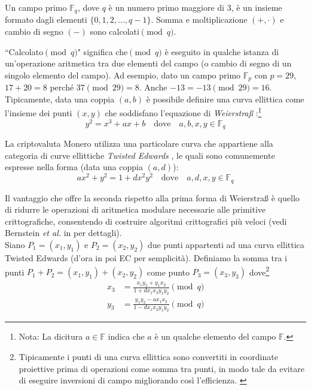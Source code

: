 Un campo primo \(\mathbb{F}_q\), dove \(q\) è un numero primo maggiore di 3, è un insieme formato dagli elementi \(\{0, 1, 2, ..., q-1\}\). Somma e moltiplicazione \((+,  \cdot)\) e cambio di segno $(-)$ sono calcolati\( \pmod q\).

``Calcolato\( \pmod q\)" significa che\( \pmod q\) è eseguito in qualche istanza di un'operazione aritmetica tra due elementi del campo (o cambio di segno di un singolo elemento del campo). Ad esempio, dato un campo primo \(\mathbb{F}_p\) con $p = 29$, $17+20=8$ perché $37 \pmod{29} = 8$. Anche $-13 = -13 \pmod{29} = 16$.\\

Tipicamente, data una coppia $(a,b)$ è possibile definire una curva ellittica come l'insieme dei punti \((x, y)\) che soddisfano l'equazione di {\em Weierstraß} \cite{Hankerson:2003:GEC:940321}:\footnote{\label{notation1}Nota: La dicitura $a \in \mathbb{F}$ indica che $a$ è un qualche elemento del campo $\mathbb{F}$.}\vspace{.175cm}
\[y^2 = x^3 + a x + b \quad \textrm{dove} \quad a, b, x, y \in \mathbb{F}_q\]

La criptovaluta Monero utilizza una particolare curva che appartiene alla categoria di curve ellittiche {\em Twisted Edwards} \cite{Bernstein2008}, le quali sono comunemente espresse nella forma (data una coppia $(a,d)$):\vspace{.175cm}
\[a x^2 + y^2 = 1 + d x^2 y^2 \quad \textrm{dove} \quad a, d, x, y \in \mathbb{F}_q \]


Il vantaggio che offre la seconda rispetto alla prima forma di Weierstraß è quello di ridurre le operazioni di aritmetica modulare necessarie alle primitive crittografiche, consentendo di costruire algoritmi crittografici più veloci (vedi Bernstein {\em et al.} in \cite{Bernstein2007} per dettagli).\\

Siano \(P_1 = (x_1, y_1)\) e \(P_2 = (x_2, y_2)\) due punti appartenti ad una curva ellittica Twisted Edwards (d'ora in poi EC per semplicità). Definiamo la somma tra i punti $P_1 + P_2 = (x_1, y_1) + (x_2, y_2)$ come punto $P_3 = (x_3, y_3)$ dove\footnote{Tipicamente i punti di una curva ellittica sono convertiti in coordinate proiettive prima di operazioni come somma tra punti, in modo tale da evitare di eseguire inversioni di campo migliorando così l'efficienza. \cite{ecc-projective}}\vspace{.175cm}
\begin{align*}
x_3 & =  \frac{x_1 y_2 + y_1 x_ 2}{1 + d x_1 x_2 y_1 y_2}  \pmod{q} \\
y_3 & =  \frac{y_1 y_2 - a x_1 x_2}{1 - d x_1 x_2 y_1 y_2} \pmod{q} 
\end{align*}

